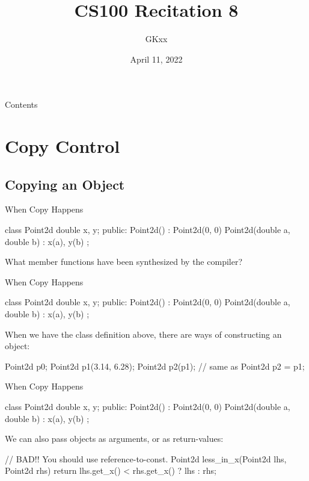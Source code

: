 \documentclass{beamer}
\title{CS100 Recitation 8}
\author{GKxx}
\date{April 11, 2022}
\begin{document}
\begin{frame}
    \maketitle
\end{frame}

\begin{frame}{Contents}
    \tableofcontents
\end{frame}

\section{Copy Control}

\subsection{Copying an Object}

\begin{frame}[fragile]{When Copy Happens}
    \begin{cpp}
class Point2d {
  double x, y;
 public:
  Point2d() : Point2d(0, 0) {}
  Point2d(double a, double b) : x(a), y(b) {}
};
    \end{cpp}
    \begin{question}
        What member functions have been synthesized by the compiler?
    \end{question}
\end{frame}

\begin{frame}[fragile]{When Copy Happens}
    \begin{cpp}
class Point2d {
  double x, y;
 public:
  Point2d() : Point2d(0, 0) {}
  Point2d(double a, double b) : x(a), y(b) {}
};
    \end{cpp}
    When we have the class definition above, there are  ways of constructing an object:
    \begin{cpp}
Point2d p0;
Point2d p1(3.14, 6.28);
Point2d p2(p1); // same as Point2d p2 = p1;
    \end{cpp}
\end{frame}

\begin{frame}[fragile]{When Copy Happens}
    \begin{cpp}
class Point2d {
  double x, y;
 public:
  Point2d() : Point2d(0, 0) {}
  Point2d(double a, double b) : x(a), y(b) {}
};
    \end{cpp}
    We can also pass  objects as arguments, or as return-values:
    \begin{cpp}
// BAD!! You should use reference-to-const.
Point2d less_in_x(Point2d lhs, Point2d rhs) {
  return lhs.get_x() < rhs.get_x() ? lhs : rhs;
}
    \end{cpp}
\end{frame}
\end{document}
